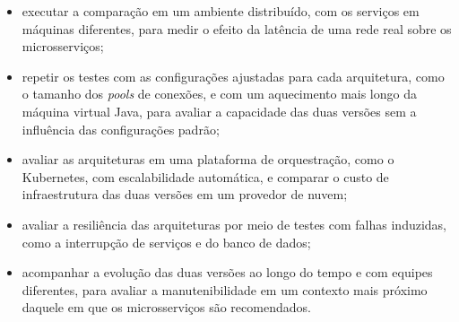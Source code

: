 \begin{itemize}
    \item executar a comparação em um ambiente distribuído, com os serviços em máquinas
    diferentes, para medir o efeito da latência de uma rede real sobre os microsserviços;
    \item repetir os testes com as configurações ajustadas para cada arquitetura, como o
    tamanho dos \textit{pools} de conexões, e com um aquecimento mais longo da máquina virtual
    Java, para avaliar a capacidade das duas versões sem a influência das configurações
    padrão;
    \item avaliar as arquiteturas em uma plataforma de orquestração, como o Kubernetes, com
    escalabilidade automática, e comparar o custo de infraestrutura das duas versões em um
    provedor de nuvem;
    \item avaliar a resiliência das arquiteturas por meio de testes com falhas induzidas, como
    a interrupção de serviços e do banco de dados;
    \item acompanhar a evolução das duas versões ao longo do tempo e com equipes diferentes,
    para avaliar a manutenibilidade em um contexto mais próximo daquele em que os
    microsserviços são recomendados.
\end{itemize}
